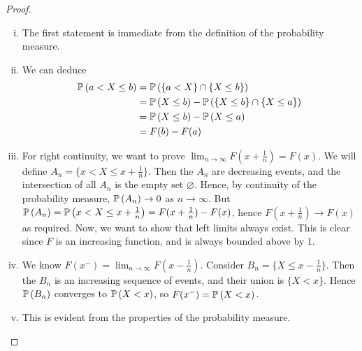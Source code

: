 \documentclass{article}
\begin{document}
\begin{proof}
    \begin{enumerate}[(i)]
        \item The first statement is immediate from the definition of the probability measure.
        \item We can deduce
              \begin{align*}
                  \mathbb{P}\left({a < X \leq b}\right) & = \mathbb{P}\left({\{ a < X \} \cap \{ X \leq b \}}\right)                  \\
                                      & = \mathbb{P}\left({X \leq b}\right) - \mathbb{P}\left({\{X \leq b\} \cap \{X \leq a\}}\right) \\
                                      & = \mathbb{P}\left({X \leq b}\right) - \mathbb{P}\left({X \leq a}\right)                       \\
                                      & = F(b) - F(a)
              \end{align*}
        \item For right continuity, we want to prove $\lim_{n \to \infty} F(x + \frac{1}{n}) = F(x)$. We will define $A_n = \{ x < X \leq x + \frac{1}{n} \}$. Then the $A_n$ are decreasing events, and the intersection of all $A_n$ is the empty set $\varnothing$. Hence, by continuity of the probability measure, $\mathbb{P}\left({A_n}\right) \to 0$ as $n \to \infty$. But $\mathbb{P}\left({A_n}\right) = \mathbb{P}\left({x < X \leq x + \frac{1}{n}}\right) = F(x + \frac{1}{n}) - F(x)$, hence $F(x + \frac{1}{n}) \to F(x)$ as required. Now, we want to show that left limits always exist. This is clear since $F$ is an increasing function, and is always bounded above by 1.
        \item We know $F(x^-) = \lim_{n \to \infty}F(x - \frac{1}{n})$. Consider $B_n = \{ X \leq x - \frac{1}{n} \}$. Then the $B_n$ is an increasing sequence of events, and their union is $\{ X < x \}$. Hence $\mathbb{P}\left({B_n}\right)$ converges to $\mathbb{P}\left({X < x}\right)$, so $F(x^-) = \mathbb{P}\left({X < x}\right)$.
        \item This is evident from the properties of the probability measure.
    \end{enumerate}
\end{proof}
\end{document}
